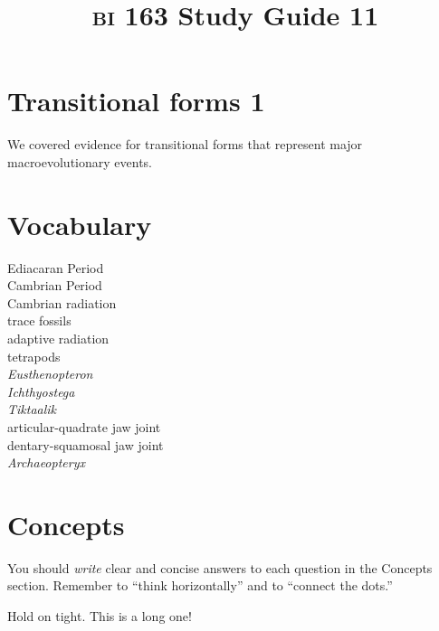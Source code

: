 \documentclass[letterpaper]{tufte-handout}
\title{{\scshape bi} 163 Study Guide 11}
\date{} %
\begin{document}
\maketitle	%

\section*{Transitional forms 1}

We covered evidence for transitional forms that represent major macroevolutionary events.

\section*{Vocabulary}

\vspace{-1\baselineskip}
\begin{multicols}{2}
Ediacaran Period\\
Cambrian Period\\
Cambrian radiation\\
trace fossils \\
adaptive radiation \\
tetrapods \\
\textit{Eusthenopteron} \\
\textit{Ichthyostega} \\
\textit{Tiktaalik} \\
articular-quadrate jaw joint \\
dentary-squamosal jaw joint\\
\textit{Archaeopteryx} \\
\end{multicols}

\section*{Concepts}

You should \emph{write} clear and concise answers to each question in the Concepts section.  Remember to ``think horizontally'' and to ``connect the dots.'' \vspace*{\baselineskip}

Hold on tight. This is a long one!
\end{document}
